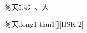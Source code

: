 \begin{entry}{冬天}{5,4}{⼎、⼤}
  \begin{phonetics}{冬天}{dong1 tian1}[][HSK 2]
  \end{phonetics}
\end{entry}
